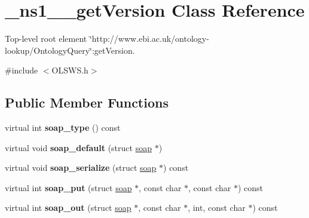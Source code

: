 \hypertarget{class__ns1____getVersion}{
\section{\_\-ns1\_\-\_\-getVersion Class Reference}
\label{class__ns1____getVersion}
}


Top-\/level root element \char`\"{}http://www.ebi.ac.uk/ontology-\/lookup/OntologyQuery\char`\"{}:getVersion.  




{\ttfamily \#include $<$OLSWS.h$>$}

\subsection*{Public Member Functions}
\begin{DoxyCompactItemize}
\item 
\hypertarget{class__ns1____getVersion_a5388d1f1a2d436dfeb2bb08649839364}{
virtual int {\bfseries soap\_\-type} () const }
\label{class__ns1____getVersion_a5388d1f1a2d436dfeb2bb08649839364}

\item 
\hypertarget{class__ns1____getVersion_a70da8367050569e8f03d82bb3d2c3d6f}{
virtual void {\bfseries soap\_\-default} (struct \hyperlink{class__ns1____getVersion_af1f697243ccc2fdb1ab70328266d1fa0}{soap} $\ast$)}
\label{class__ns1____getVersion_a70da8367050569e8f03d82bb3d2c3d6f}

\item 
\hypertarget{class__ns1____getVersion_ad35c05d7453f7bafa83491a84ad188fc}{
virtual void {\bfseries soap\_\-serialize} (struct \hyperlink{class__ns1____getVersion_af1f697243ccc2fdb1ab70328266d1fa0}{soap} $\ast$) const }
\label{class__ns1____getVersion_ad35c05d7453f7bafa83491a84ad188fc}

\item 
\hypertarget{class__ns1____getVersion_a57d54602be8d569d9b68ef4abcb7501b}{
virtual int {\bfseries soap\_\-put} (struct \hyperlink{class__ns1____getVersion_af1f697243ccc2fdb1ab70328266d1fa0}{soap} $\ast$, const char $\ast$, const char $\ast$) const }
\label{class__ns1____getVersion_a57d54602be8d569d9b68ef4abcb7501b}

\item 
\hypertarget{class__ns1____getVersion_a620f5ee471a324acf1baac6465fb8400}{
virtual int {\bfseries soap\_\-out} (struct \hyperlink{class__ns1____getVersion_af1f697243ccc2fdb1ab70328266d1fa0}{soap} $\ast$, const char $\ast$, int, const char $\ast$) const }
\label{class__ns1____getVersion_a620f5ee471a324acf1baac6465fb8400}


\end{DoxyCompactItemize}
